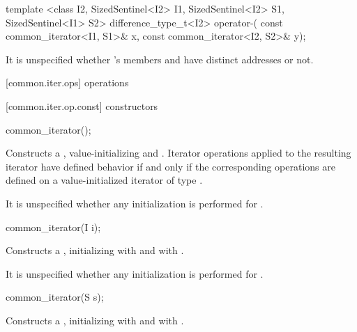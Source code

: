 \begin{addedblock}
\begin{codeblock}
{{{{  template <class I2, SizedSentinel<I2> I1, SizedSentinel<I2> S1, SizedSentinel<I1> S2>
  difference_type_t<I2> operator-(
    const common_iterator<I1, S1>& x, const common_iterator<I2, S2>& y);
}}}}
\end{codeblock}

\pnum
\enternote It is unspecified whether 's members
 and  have distinct addresses or not.\exitnote

[common.iter.ops]{ operations}

[common.iter.op.const]{ constructors}

%
\begin{itemdecl}
common_iterator();
\end{itemdecl}

\begin{itemdescr}
\pnum
\effects Constructs a , value-initializing 
and . Iterator operations applied to the resulting iterator have defined
behavior if and only if the corresponding operations are defined on a
value-initialized iterator of type .

\pnum
\remarks It is unspecified whether any initialization is performed for
.
\end{itemdescr}

%
\begin{itemdecl}
common_iterator(I i);
\end{itemdecl}

\begin{itemdescr}
\pnum
\effects Constructs a , initializing
 with  and  with .
\end{itemdescr}

\pnum
\remarks It is unspecified whether any initialization is performed for
.

%
\begin{itemdecl}
common_iterator(S s);
\end{itemdecl}

\begin{itemdescr}
\pnum
\effects Constructs a , initializing
 with  and  with .
\end{itemdescr}


\end{addedblock}
